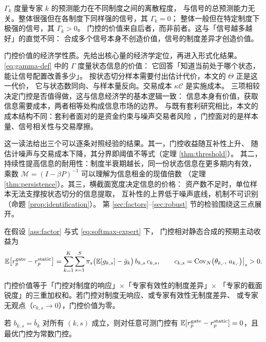 $\Gamma_k$ 度量专家 $k$ 的预测能力在不同制度之间的离散程度，
与信号的总预测能力无关。整体很强但在各制度下同样强的信号，其 $\Gamma_k=0$；
整体一般但在特定制度下极强的信号，其 $\Gamma_k>0$。
门控的价值来自后者，而非前者。这与「信号越多越好」的直觉不同：
合成多个信号本身不创造价值，信号的制度差异才创造价值。

门控价值的经济学性质。先给出核心量的经济学定位，再进入形式化结果。
\eqref{eq:gamma-def} 中的 $\Gamma$ 度量状态信息的价值：
它回答「知道当前处于哪个状态，能让信号配置改善多少」。
按状态切分样本需要付出估计代价，本文的 $\Theta$ 正是这一代价，
它与状态数同向、与样本量反向。交易成本 $\kappa\mathcal{C}$ 是实施成本。
三项相较决定门控是否值得做，这与信息经济学的基本逻辑一致：
信息本身有价值，获取信息需要成本，两者相等处构成信息市场的边界\cite{grossman1980}。
与既有套利研究相比，本文的成本结构不同：套利者面对的是资金约束与噪声交易者风险
\cite{shleifer1997}，门控面对的是样本量、信号相关性与交易摩擦。

这一读法给出三个可以逐条对照经验的结果。其一，门控收益随互补性上升、
随估计噪声与交易成本下降，其分界即阈值不等式（定理 \ref{thm:threshold}）。
其二，持续性提高信息的耐用性：制度半衰期越长，同一份状态信息在更多期内有效，
乘数 $\mathcal{M}=(I-\beta P)^{-1}$ 可以理解为信息租金的现值倍数
（定理 \ref{thm:persistence}）。其三，横截面宽度决定信息的价格：
资产数不足时，单位样本无法支撑按状态切分的信息提取，
互补性的上界低于噪声底线，机制不可识别（命题 \ref{prop:identification}）。
第 \ref{sec:factors}--\ref{sec:robust} 节的检验围绕这三点展开。

\begin{proposition}[门控价值的精确分解]
\label{prop:decomp}
在假设 \ref{ass:factor} 与式 \eqref{eq:softmax-expert} 下，
门控相对静态合成的预期主动收益为
\begin{equation}
\mathbb{E}\big[r_p^{\text{gate}}-r_p^{\text{static}}\big]
=\sum_{k=1}^K\sum_{s=1}^S\pi_s\big(\mathbb{E}[g_{k,s}]-\bar g_k\big)\,b_{k,s}\,c_{k,s},
\qquad
c_{k,s}=\mathrm{Cov}_N\big(\theta_{k,\cdot},\,a_{k,\cdot}\big)\big|_s>0 .
\label{eq:prop1}
\end{equation}
\end{proposition}

门控价值等于「门控对制度的响应」$ \times $「专家有效性的制度差异」$ \times $
「专家的截面锐度」的三重加权和。若门控对制度无响应、或专家有效性无制度差异、
或专家无观点（$c_{k,s}\to0$），门控价值为零。

\begin{corollary}[识别条件]
\label{cor:identification}
若 $b_{k,s}=\bar b_k$ 对所有 $(k,s)$ 成立，则对任意可测门控有
$\mathbb{E}[r_p^{\text{gate}}-r_p^{\text{static}}]=0$，且最优门控为常数门控。
\end{corollary}

